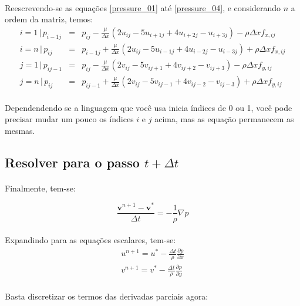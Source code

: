 \documentclass[poisson.tex]{subfiles}
\begin{document}
\paragraph{} Reescrevendo-se as equações \ref{pressure_01} até \ref{pressure_04}, e considerando $n$ a ordem da matriz, temos:
\begin{eqnarray}
i=1 \,|\, p_{i-1j}&=&p_{ij}-\frac{\mu}{\Delta x}\left(2u_{ij}-5u_{i+1j}+4u_{i+2j}-u_{i+3j}\right)-\rho\Delta x f_{x,ij}\\
i=n \,|\, p_{ij}&=&p_{i-1j}+\frac{\mu}{\Delta x}\left(2u_{ij}-5u_{i-1j}+4u_{i-2j}-u_{i-3j}\right)+\rho\Delta x f_{x,ij}\\
j=1 \,|\, p_{ij-1}&=&p_{ij}-\frac{\mu}{\Delta x}\left(2v_{ij}-5v_{ij+1}+4v_{ij+2}-v_{ij+3}\right)-\rho\Delta x f_{y,ij}\\
j=n \,|\, p_{ij}&=&p_{ij-1}+\frac{\mu}{\Delta x}\left(2v_{ij}-5v_{ij-1}+4v_{ij-2}-v_{ij-3}\right)+\rho\Delta x f_{y,ij}
\end{eqnarray}
\paragraph{} Dependendendo se a linguagem que você usa inicia índices de 0 ou 1, você pode precisar mudar um pouco os índices $i$ e $j$ acima, mas as equação permanecem as mesmas. 
\subsection{Resolver para o passo $t+\Delta t$}
\paragraph{} Finalmente, tem-se: 

\begin{equation}
\frac{\textbf{v}^{n+1}-\textbf{v}^*}{\Delta t}=-\frac{1}{\rho}\nabla p
\end{equation}
\paragraph{} Expandindo para as equações escalares, tem-se:
\begin{eqnarray}
u^{n+1}=u^*-\frac{\Delta t}{\rho}\frac{\partial p}{\partial x}\\
v^{n+1}=v^*-\frac{\Delta t}{\rho}\frac{\partial p}{\partial y}
\end{eqnarray}
\paragraph{} Basta discretizar os termos das derivadas parciais agora:
\end{document}

